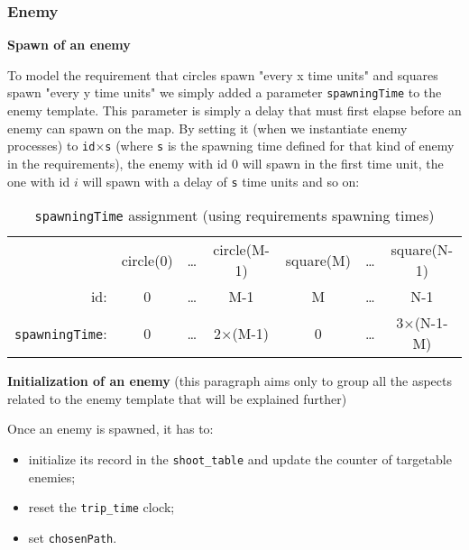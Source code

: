 \documentclass[
10pt, %
a4paper, %
oneside, %
headinclude,footinclude, %
BCOR5mm, %
]{scrartcl}
\begin{document}
			\subsubsection{Enemy}
				\begin{flushleft}
					\textbf{Spawn of an enemy}
					
					To model the requirement that circles spawn "every x time units" and squares spawn "every y time units" we simply added a parameter \texttt{spawningTime} to the enemy template. This parameter is simply a delay that must first elapse before an enemy can spawn on the map. By setting it (when we instantiate enemy processes) to \texttt{id$\times$s} (where \texttt{s} is the spawning time defined for that kind of enemy in the requirements), the enemy with id $0$ will spawn in the first time unit, the one with id $i$ will spawn with a delay of \texttt{s} time units and so on:
					\begin{table}[h!]
						\centering
						\begin{tabular}{rcccccc}
							& circle(0) & \dots & circle(M-1) & square(M) & \dots & square(N-1) \\
							id: & 0 & \dots & M-1 & M & \dots & N-1\\
							\texttt{spawningTime}: & 0 & \dots & 2$\times$(M-1) & 0 & \dots & 3$\times$(N-1-M) \\
						\end{tabular}
						\caption{\texttt{spawningTime} assignment (using requirements spawning times)}
					\end{table}
				\end{flushleft}
				\begin{flushleft}
					\textbf{Initialization of an enemy} (this paragraph aims only to group all the aspects related to the enemy template that will be explained further)
					
					Once an enemy is spawned, it has to:
					\begin{itemize}
						\item initialize its record in the \texttt{shoot\_table} and update the counter of targetable enemies;
						\item reset the \texttt{trip\_time} clock;
						\item set \texttt{chosenPath}.
					\end{itemize}
				\end{flushleft}
\end{document}
